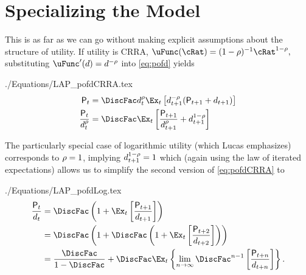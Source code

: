 \documentclass{\handout}
\begin{document}
\hypertarget{specializing-the-model}{}
\section{Specializing the Model}

This is as far as we can go without making explicit assumptions about the structure
of utility.  If utility is CRRA, $\uFunc(\cRat)=(1-\CRRA)^{-1}\cRat^{1-\CRRA},$ substituting $\uFunc^{\prime}(\dvdnd)=\dvdnd^{-\CRRA}$ into \eqref{eq:pofd} yields
\begin{verbatimwrite}{./Equations/LAP_pofdCRRA.tex}
\begin{equation}\begin{gathered}\begin{aligned}
      \Price_{t} & =  \DiscFac \dvdnd_{t}^{\CRRA} \Ex_{t}\left[\dvdnd_{t+1}^{-\CRRA}(\Price_{t+1}+\dvdnd_{t+1})\right] \label{eq:pofdCRRA}
\\ \frac{\Price_{t}}{\dvdnd_{t}^{\CRRA}} & =  \DiscFac \Ex_{t}\left[\frac{\Price_{t+1}}{\dvdnd_{t+1}^{\CRRA}}+\dvdnd_{t+1}^{1-\CRRA}\right] 
\end{aligned}\end{gathered}\end{equation}
\end{verbatimwrite}



The particularly special case of logarithmic utility (which Lucas emphasizes) corresponds to $\rho=1$, implying $d_{t+1}^{1-\rho}=1$ which (again using the law of iterated expectations) allows us to simplify the second version of \eqref{eq:pofdCRRA} to
\begin{verbatimwrite}{./Equations/LAP_pofdLog.tex}
\begin{equation*}\begin{gathered}\begin{aligned}
\frac{\Price_{t}}{\dvdnd_{t}} & =  \DiscFac \left(1+\Ex_{t} \left[\frac{{\Price}_{t+1}}{\dvdnd_{t+1}}\right]\right)  \label{eq:pofdLog}
\\ & =  \DiscFac \left(1+\DiscFac \left(1+\Ex_{t}\left[\frac{{\Price}_{t+2}}{\dvdnd_{t+2}}\right]\right)\right)
\\ & =  \frac{\DiscFac}{1-\DiscFac} + \DiscFac \Ex_{t}\left\{\lim_{n\rightarrow \infty}\DiscFac^{n-1}\left[\frac{\Price_{t+n}}{\dvdnd_{t+n}}\right]\right\}.
\end{aligned}\end{gathered}\end{equation*}
\end{verbatimwrite}

\end{document}
